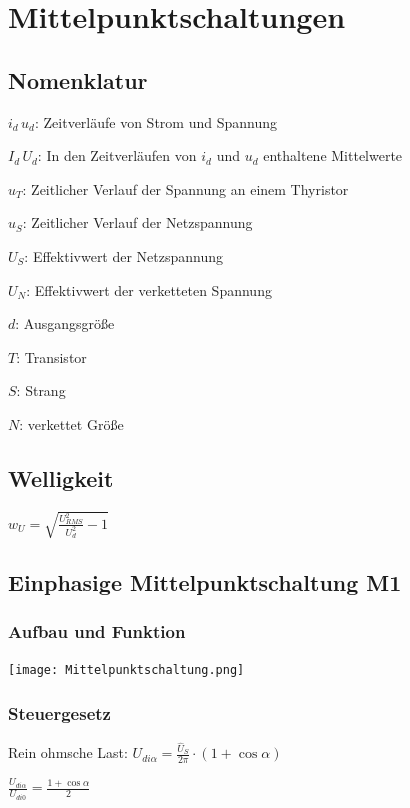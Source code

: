 \documentclass[german]{latex4ei/latex4ei_sheet}
\begin{document}
\section{Mittelpunktschaltungen}
	\begin{sectionbox}
		\subsection{Nomenklatur}
			\begin{bluebox}
				\item $i_d\,u_d$: Zeitverläufe von Strom und Spannung
				\item $I_d\,U_d$: In den Zeitverläufen von $i_d$ und $u_d$ enthaltene Mittelwerte
				\item $u_T$: Zeitlicher Verlauf der Spannung an einem Thyristor
				\item $u_S$: Zeitlicher Verlauf der Netzspannung
				\item $U_S$: Effektivwert der Netzspannung
				\item $U_N$: Effektivwert der verketteten Spannung
				\item $d$: Ausgangsgröße
				\item $T$: Transistor
				\item $S$: Strang
				\item $N$: verkettet Größe
			\end{bluebox}
		\subsection{Welligkeit}
			\begin{bluebox}
				\item $w_U = \sqrt{\frac{U_{RMS}^2}{U_d^2}-1}$
			\end{bluebox}
		\subsection{Einphasige Mittelpunktschaltung M1}
			\subsubsection{Aufbau und Funktion}
				\texttt{[image: Mittelpunktschaltung.png]}
			\subsubsection{Steuergesetz}
					Rein ohmsche Last: $U_{di\alpha} = \frac{\hat{U}_S}{2\pi}\cdot (1+\cos  \alpha)$

					$\frac{U_{di\alpha}}{U_{di0}} = \frac{1+\cos \alpha}{2}$


\end{sectionbox}
\end{document}
